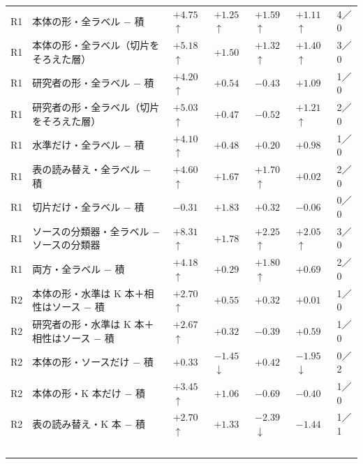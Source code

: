 \begin{longtable}{>{\raggedright}p{0.75cm}>{\raggedright}p{5.6cm}>{\raggedright}p{2.05cm}>{\raggedright}p{2.05cm}>{\raggedright}p{2.05cm}>{\raggedright}p{2.05cm}p{0.75cm}}
R1 & 本体の形・全ラベル $-$ 積 & $+4.75$$\uparrow$\newline{\tiny [$+$2.6, $+$6.9]} & $+1.25$$\uparrow$\newline{\tiny [$+$0.1, $+$2.4]} & $+1.59$$\uparrow$\newline{\tiny [$+$1.0, $+$2.2]} & $+1.11$$\uparrow$\newline{\tiny [$+$0.1, $+$2.1]} & 4／0 \\
R1 & 本体の形・全ラベル（切片をそろえた層） & $+5.18$$\uparrow$ & $+1.50$ & $+1.32$$\uparrow$ & $+1.40$$\uparrow$ & 3／0 \\
R1 & 研究者の形・全ラベル $-$ 積 & $+4.20$$\uparrow$ & $+0.54$ & $-0.43$ & $+1.09$ & 1／0 \\
R1 & 研究者の形・全ラベル（切片をそろえた層） & $+5.03$$\uparrow$ & $+0.47$ & $-0.52$ & $+1.21$$\uparrow$ & 2／0 \\
R1 & 水準だけ・全ラベル $-$ 積 & $+4.10$$\uparrow$ & $+0.48$ & $+0.20$ & $+0.98$ & 1／0 \\
R1 & 表の読み替え・全ラベル $-$ 積 & $+4.60$$\uparrow$ & $+1.67$ & $+1.70$$\uparrow$ & $+0.02$ & 2／0 \\
R1 & 切片だけ・全ラベル $-$ 積 & $-0.31$ & $+1.83$ & $+0.32$ & $-0.06$ & 0／0 \\
R1 & ソースの分類器・全ラベル $-$ ソースの分類器 & $+8.31$$\uparrow$ & $+1.78$ & $+2.25$$\uparrow$ & $+2.05$$\uparrow$ & 3／0 \\
R1 & 両方・全ラベル $-$ 積 & $+4.18$$\uparrow$ & $+0.29$ & $+1.80$$\uparrow$ & $+0.69$ & 2／0 \\
R2 & 本体の形・水準は K 本＋相性はソース $-$ 積 & $+2.70$$\uparrow$\newline{\tiny [$+$1.6, $+$3.8]} & $+0.55$\newline{\tiny [$-$0.1, $+$1.2]} & $+0.32$\newline{\tiny [$-$0.4, $+$1.0]} & $+0.01$\newline{\tiny [$-$0.7, $+$0.7]} & 1／0 \\
R2 & 研究者の形・水準は K 本＋相性はソース $-$ 積 & $+2.67$$\uparrow$ & $+0.32$ & $-0.39$ & $+0.59$ & 1／0 \\
R2 & 本体の形・ソースだけ $-$ 積 & $+0.33$ & $-1.45$$\downarrow$ & $+0.42$ & $-1.95$$\downarrow$ & 0／2 \\
R2 & 本体の形・K 本だけ $-$ 積 & $+3.45$$\uparrow$ & $+1.06$ & $-0.69$ & $-0.40$ & 1／0 \\
R2 & 表の読み替え・K 本 $-$ 積 & $+2.70$$\uparrow$ & $+1.33$ & $-2.39$$\downarrow$ & $-1.44$ & 1／1 \\
$$
\end{longtable}
